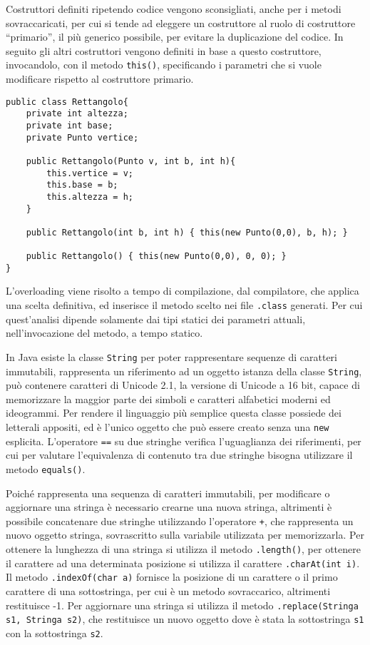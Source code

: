 \documentclass{article}
\numberwithin{equation}{subsection}
\begin{document}
Costruttori definiti ripetendo codice vengono sconsigliati, anche per i metodi sovraccaricati, per cui si tende ad eleggere un costruttore al ruolo di costruttore ``primario'', 
il più generico possibile, per evitare la duplicazione del codice. In seguito gli altri costruttori vengono definiti in base a questo costruttore, invocandolo, con il metodo \verb|this()|, 
specificando i parametri che si vuole modificare rispetto al costruttore primario. 

\begin{verbatim}
public class Rettangolo{
    private int altezza;
    private int base;
    private Punto vertice;

    public Rettangolo(Punto v, int b, int h){
        this.vertice = v;
        this.base = b;
        this.altezza = h;
    }

    public Rettangolo(int b, int h) { this(new Punto(0,0), b, h); }

    public Rettangolo() { this(new Punto(0,0), 0, 0); }
}   
\end{verbatim}

L'overloading viene risolto a tempo di compilazione, dal compilatore, che applica una scelta definitiva, ed inserisce il metodo scelto nei file \verb|.class| generati. Per cui quest'analisi 
dipende solamente dai tipi statici dei parametri attuali, nell'invocazione del metodo, a tempo statico. 



In Java esiste la classe \verb|String| per poter rappresentare sequenze di caratteri immutabili, rappresenta un riferimento ad un oggetto istanza della classe \verb|String|, può contenere 
caratteri di Unicode 2.1, la versione di Unicode a 16 bit, capace di memorizzare la maggior parte dei simboli e caratteri alfabetici moderni ed ideogrammi.  
Per rendere il linguaggio più semplice questa classe possiede dei letterali appositi, ed è l'unico oggetto che può essere creato senza una \verb|new| esplicita. L'operatore 
\verb|==| su due stringhe verifica l'uguaglianza dei riferimenti, per cui per valutare l'equivalenza di contenuto tra due stringhe bisogna utilizzare il metodo \verb|equals()|. 

Poiché rappresenta una sequenza di caratteri immutabili, per modificare o aggiornare una stringa è necessario crearne una nuova stringa, altrimenti è possibile concatenare due 
stringhe utilizzando l'operatore \verb|+|, che rappresenta un nuovo oggetto stringa, sovrascritto sulla variabile utilizzata per memorizzarla. 
Per ottenere la lunghezza di una stringa si utilizza il metodo \verb|.length()|, per ottenere il carattere ad una determinata posizione si utilizza il carattere \verb|.charAt(int i)|. 
Il metodo \verb|.indexOf(char a)| fornisce la posizione di un carattere o il primo carattere di una sottostringa, per cui è un metodo sovraccarico, altrimenti restituisce -1. 
Per aggiornare una stringa si utilizza il metodo \verb|.replace(Stringa s1, Stringa s2)|, che restituisce un nuovo oggetto dove è stata la sottostringa \verb|s1| con la 
sottostringa \verb|s2|.  
\end{document}
